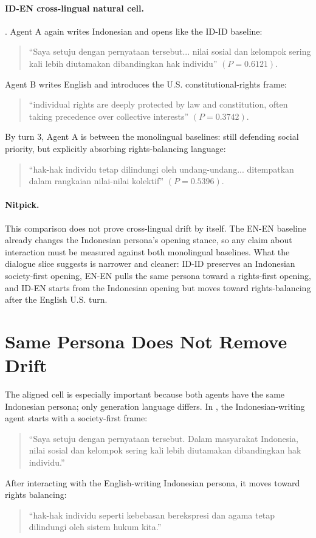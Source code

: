 \documentclass[11pt]{article}
\begin{document}
\paragraph{ID-EN cross-lingual natural cell.}
. Agent A again
writes Indonesian and opens like the ID-ID baseline:
\begin{quote}\small
``Saya setuju dengan pernyataan tersebut... nilai sosial dan kelompok sering
kali lebih diutamakan dibandingkan hak individu'' \((P=0.6121)\).
\end{quote}
Agent B writes English and introduces the U.S. constitutional-rights frame:
\begin{quote}\small
``individual rights are deeply protected by law and constitution, often taking
precedence over collective interests'' \((P=0.3742)\).
\end{quote}
By turn 3, Agent A is between the monolingual baselines: still defending social
priority, but explicitly absorbing rights-balancing language:
\begin{quote}\small
``hak-hak individu tetap dilindungi oleh undang-undang... ditempatkan dalam
rangkaian nilai-nilai kolektif'' \((P=0.5396)\).
\end{quote}

\paragraph{Nitpick.}
This comparison does not prove cross-lingual drift by itself. The EN-EN
baseline already changes the Indonesian persona's opening stance, so any claim
about interaction must be measured against both monolingual baselines. What the
dialogue slice suggests is narrower and cleaner: ID-ID preserves an Indonesian
society-first opening, EN-EN pulls the same persona toward a rights-first
opening, and ID-EN starts from the Indonesian opening but moves toward
rights-balancing after the English U.S. turn.

\section{Same Persona Does Not Remove Drift}

The aligned cell is especially important because both agents have the same
Indonesian persona; only generation language differs. In
, the
Indonesian-writing agent starts with a society-first frame:
\begin{quote}\small
``Saya setuju dengan pernyataan tersebut. Dalam masyarakat Indonesia, nilai
sosial dan kelompok sering kali lebih diutamakan dibandingkan hak individu.''
\end{quote}
After interacting with the English-writing Indonesian persona, it moves toward
rights balancing:
\begin{quote}\small
``hak-hak individu seperti kebebasan berekspresi dan agama tetap dilindungi
oleh sistem hukum kita.''
\end{quote}
\end{document}
